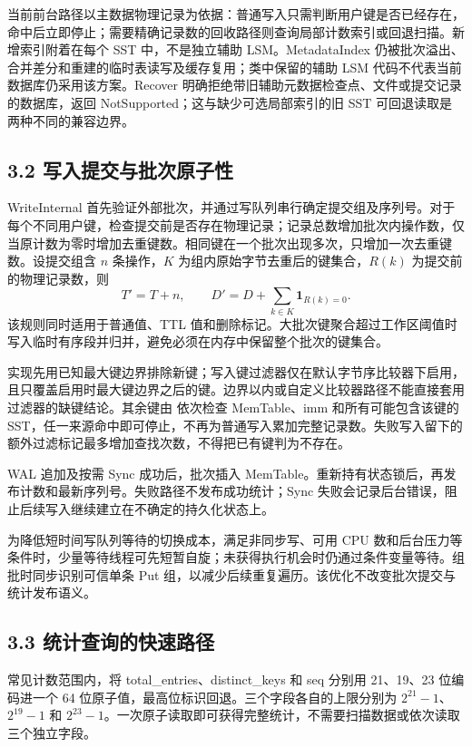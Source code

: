 \documentclass[UTF8,a4paper,10pt,twocolumn,fontset=fandol]{ctexart}
\begin{document}
当前前台路径以主数据物理记录为依据：普通写入只需判断用户键是否已经存在，命中后立即停止；需要精确记录数的回收路径则查询局部计数索引或回退扫描。新增索引附着在每个 SST 中，不是独立辅助 LSM。MetadataIndex 仍被批次溢出、合并差分和重建的临时表读写及缓存复用；类中保留的辅助 LSM 代码不代表当前数据库仍采用该方案。Recover 明确拒绝带旧辅助元数据检查点、文件或提交记录的数据库，返回 NotSupported；这与缺少可选局部索引的旧 SST 可回退读取是两种不同的兼容边界。

\subsection*{3.2 写入提交与批次原子性}
WriteInternal 首先验证外部批次，并通过写队列串行确定提交组及序列号。对于每个不同用户键，检查提交前是否存在物理记录；记录总数增加批次内操作数，仅当原计数为零时增加去重键数。相同键在一个批次出现多次，只增加一次去重键数。设提交组含 $n$ 条操作，$K$ 为组内原始字节去重后的键集合，$R(k)$ 为提交前的物理记录数，则
\[
 T'=T+n,\qquad D'=D+\sum_{k\in K}\mathbf{1}_{R(k)=0}.
\]
该规则同时适用于普通值、TTL 值和删除标记。大批次键聚合超过工作区阈值时写入临时有序段并归并，避免必须在内存中保留整个批次的键集合。

实现先用已知最大键边界排除新键；写入键过滤器仅在默认字节序比较器下启用，且只覆盖启用时最大键边界之后的键。边界以内或自定义比较器路径不能直接套用过滤器的缺键结论。其余键由  依次检查 MemTable、imm 和所有可能包含该键的 SST，任一来源命中即可停止，不再为普通写入累加完整记录数。失败写入留下的额外过滤标记最多增加查找次数，不得把已有键判为不存在。

WAL 追加及按需 Sync 成功后，批次插入 MemTable。重新持有状态锁后，再发布计数和最新序列号。失败路径不发布成功统计；Sync 失败会记录后台错误，阻止后续写入继续建立在不确定的持久化状态上。

为降低短时间写队列等待的切换成本，满足非同步写、可用 CPU 数和后台压力等条件时，少量等待线程可先短暂自旋；未获得执行机会时仍通过条件变量等待。组批时同步识别可信单条 Put 组，以减少后续重复遍历。该优化不改变批次提交与统计发布语义。

\subsection*{3.3 统计查询的快速路径}
常见计数范围内，将 total\_entries、distinct\_keys 和 seq 分别用 21、19、23 位编码进一个 64 位原子值，最高位标识回退。三个字段各自的上限分别为 $2^{21}-1$、$2^{19}-1$ 和 $2^{23}-1$。一次原子读取即可获得完整统计，不需要扫描数据或依次读取三个独立字段。
\end{document}
